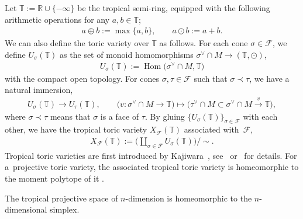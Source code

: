 \documentclass[pdftex]{sigma}
\numberwithin{equation}{section}
\begin{document}
Let ${\mathbb T}:={\mathbb R} \cup \{ -\infty \}$ be the tropical semi-ring, equipped with the following arithmetic operations for any $a, b \in {\mathbb T}$;
\begin{gather*}
a \oplus b :=\max \{ a, b \}, \qquad a \odot b :=a+b.
\end{gather*}
We can also def\/ine the toric variety over ${\mathbb T}$ as follows. For each cone $\sigma \in {\mathcal F}$, we def\/ine $U_\sigma({\mathbb T})$ as the set of monoid homomorphisms $\sigma^\vee \cap M \to ({\mathbb T}, \odot)$,
\begin{gather*}
U_\sigma({\mathbb T}):=\operatorname{Hom}\big(\sigma^\vee \cap M, {\mathbb T}\big)
\end{gather*}
with the compact open topology. For cones $\sigma, \tau \in {\mathcal F}$ such that $\sigma \prec \tau$, we have a natural immersion,
\begin{gather*}
U_\sigma({\mathbb T}) \to U_\tau({\mathbb T}),\qquad \big(v \colon \sigma^\vee \cap M \to {\mathbb T}\big) \mapsto \big(\tau^\vee \cap M \subset \sigma^\vee \cap M \xrightarrow{v} {\mathbb T}\big),
\end{gather*}
where $\sigma \prec \tau$ means that $\sigma$ is a face of $\tau$. By gluing $\{ U_\sigma({\mathbb T}) \}_{\sigma \in {\mathcal F}}$ with each other, we have the tropical toric variety $X_{\mathcal F}({\mathbb T})$ associated with~${\mathcal F}$,
\begin{gather*}
X_{\mathcal F}({\mathbb T}):=\bigg( \coprod_{\sigma \in {\mathcal F}} U_\sigma({\mathbb T}) \bigg) \bigg/ {\sim}.
\end{gather*}
Tropical toric varieties are f\/irst introduced by Kajiwara~\cite{KajiwaraPre}, see~\cite{KajiwaraPre} or~\cite{MR2428356} for details. For a~projective toric variety, the associated tropical toric variety is homeomorphic to the moment polytope of it \cite[Remark~1.3]{MR2428356}.

\begin{Example}The tropical projective space of $n$-dimension is homeomorphic to the $n$-dimen\-sio\-nal simplex.
\end{Example}
\end{document}
